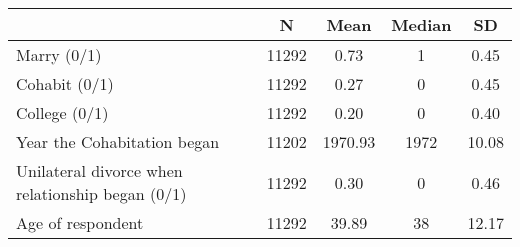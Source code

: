 {
\def\sym#1{\ifmmode^{#1}\else\(^{#1}\)\fi}
\begin{tabular}{l*{1}{cccc}}
\toprule
                    &           N&        Mean&      Median&          SD\\
\midrule
Marry (0/1)         &       11292&        0.73&           1&        0.45\\
Cohabit (0/1)       &       11292&        0.27&           0&        0.45\\
College (0/1)       &       11292&        0.20&           0&        0.40\\
Year the Cohabitation began&       11202&     1970.93&        1972&       10.08\\
Unilateral divorce when relationship began (0/1)&       11292&        0.30&           0&        0.46\\
Age of respondent   &       11292&       39.89&          38&       12.17\\
\bottomrule
\end{tabular}
}
